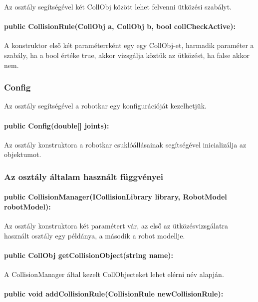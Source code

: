 Az osztály segítségével két CollObj között lehet felvenni ütközési szabályt.

\paragraph{public CollisionRule(CollObj a, CollObj b, bool collCheckActive):} 

A konstruktor első két paraméterrként egy egy CollObj-et, harmadik paraméter a szabály, ha a bool értéke true, akkor vizsgálja köztük az ütközést, ha false akkor nem. 

\subsubsection*{Config}

Az osztály segítségével a robotkar egy konfigurációját kezelhetjük.

\paragraph{public Config(double[] joints):} 

Az osztály konstruktora a robotkar csuklóállásainak segítségével inicializálja az objektumot.

\subsubsection*{Az osztály általam használt függvényei}

\paragraph{public CollisionManager(ICollisionLibrary library, RobotModel robotModel): }

Az osztály konstruktora két paramétert vár, az első az ütközésvizsgálatra használt osztály egy példánya, a második a robot modellje.

\paragraph{public CollObj getCollisionObject(string name): } 

A CollisionManager által kezelt CollObjecteket lehet elérni név alapján.

\paragraph{public void addCollisionRule(CollisionRule newCollisionRule):}

